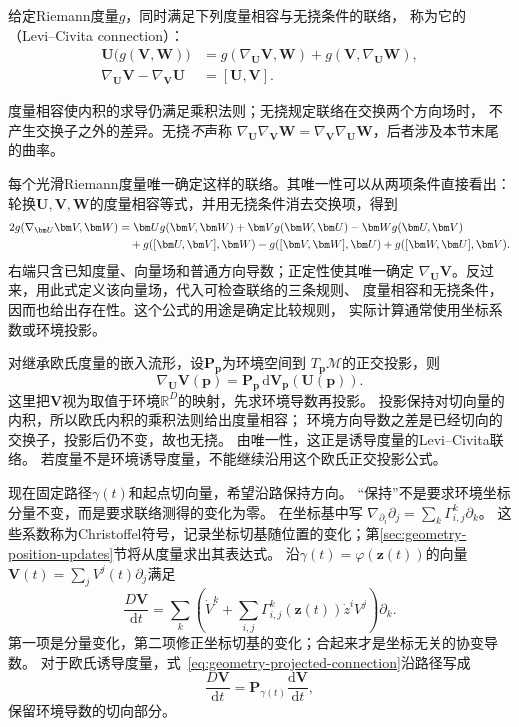 \begin{definition}
\label{def:geometry-levi-civita-connection}
给定Riemann度量$g$，同时满足下列度量相容与无挠条件的联络，
称为它的（Levi--Civita connection）：
\begin{align*}
 \bm U\bigl(g(\bm V,\bm W)\bigr)
 &=g(\nabla_{\bm U}\bm V,\bm W)+g(\bm V,\nabla_{\bm U}\bm W),\\
 \nabla_{\bm U}\bm V-\nabla_{\bm V}\bm U&=[\bm U,\bm V].
\end{align*}
\end{definition}
度量相容使内积的求导仍满足乘积法则；无挠规定联络在交换两个方向场时，
不产生交换子之外的差异。无挠\emph{不}声称
$\nabla_{\bm U}\nabla_{\bm V}\bm W
=\nabla_{\bm V}\nabla_{\bm U}\bm W$，后者涉及本节末尾的曲率。

每个光滑Riemann度量唯一确定这样的联络。其唯一性可以从两项条件直接看出：
轮换$\bm U,\bm V,\bm W$的度量相容等式，并用无挠条件消去交换项，得到
\begin{align}
 2g(\nabla_{\bm U}\bm V,\bm W)
 &=\bm U g(\bm V,\bm W)+\bm V g(\bm W,\bm U)
   -\bm W g(\bm U,\bm V)\notag\\
 &\quad+g([\bm U,\bm V],\bm W)-g([\bm V,\bm W],\bm U)
   +g([\bm W,\bm U],\bm V).
 \label{eq:geometry-koszul-formula}
\end{align}
右端只含已知度量、向量场和普通方向导数；正定性使其唯一确定
$\nabla_{\bm U}\bm V$。反过来，用此式定义该向量场，代入可检查联络的三条规则、
度量相容和无挠条件，因而也给出存在性。这个公式的用途是确定比较规则，
实际计算通常使用坐标系数或环境投影。

对继承欧氏度量的嵌入流形，设$\bm P_{\bm p}$为环境空间到
$T_{\bm p}\mathcal M$的正交投影，则
\begin{equation}
 \nabla_{\bm U}\bm V(\bm p)
 =\bm P_{\bm p}\,\mathrm d\bm V_{\bm p}(\bm U(\bm p)).
 \label{eq:geometry-projected-connection}
\end{equation}
这里把$\bm V$视为取值于环境$\mathbb R^D$的映射，先求环境导数再投影。
投影保持对切向量的内积，所以欧氏内积的乘积法则给出度量相容；
环境方向导数之差是已经切向的交换子，投影后仍不变，故也无挠。
由唯一性，这正是诱导度量的Levi--Civita联络。
若度量不是环境诱导度量，不能继续沿用这个欧氏正交投影公式。


现在固定路径$\gamma(t)$和起点切向量，希望沿路保持方向。
“保持”不是要求环境坐标分量不变，而是要求联络测得的变化为零。
在坐标基中写
$\nabla_{\partial_i}\partial_j=\sum_k\Gamma^k_{i,j}\partial_k$。
这些系数称为Christoffel符号，记录坐标切基随位置的变化；第\ref{sec:geometry-position-updates}节将从度量求出其表达式。
沿$\gamma(t)=\varphi(\bm z(t))$的向量
$\bm V(t)=\sum_jV^j(t)\partial_j$满足
\begin{equation}
 \frac{D\bm V}{\mathrm dt}
 =\sum_k\left(\dot V^k+
     \sum_{i,j}\Gamma^k_{i,j}(\bm z(t))\dot z^iV^j\right)\partial_k.
 \label{eq:geometry-covariant-derivative-along-path}
\end{equation}
第一项是分量变化，第二项修正坐标切基的变化；合起来才是坐标无关的协变导数。
对于欧氏诱导度量，式~\eqref{eq:geometry-projected-connection}沿路径写成
\[
 \frac{D\bm V}{\mathrm dt}
 =\bm P_{\gamma(t)}\frac{\mathrm d\bm V}{\mathrm dt},
\]
保留环境导数的切向部分。

